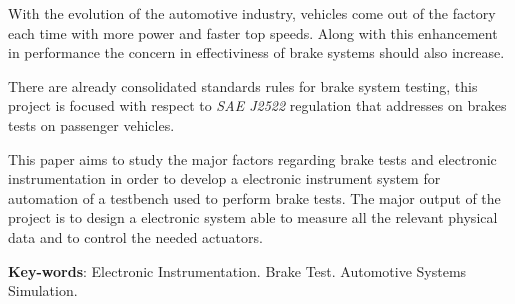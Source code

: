 \begin{resumo}

With the evolution of the automotive industry, vehicles come out of the factory each time with more power and faster top speeds. Along with this enhancement in performance the concern in effectiviness of brake systems should also increase.
\par
There are already consolidated standards rules for brake system testing, this project is focused with respect to \textit{SAE J2522} regulation that addresses on brakes tests on passenger vehicles. 
\par
This paper aims to study the major factors regarding brake tests and electronic instrumentation in order to develop a electronic instrument system for automation of a testbench used to perform brake tests. The major output of the project is to design a electronic system able to measure all the relevant physical data and to control the needed actuators.

 \vspace{\onelineskip}
    
 \noindent
   \textbf{Key-words}: Electronic Instrumentation. Brake Test. Automotive Systems Simulation.
\end{resumo}
